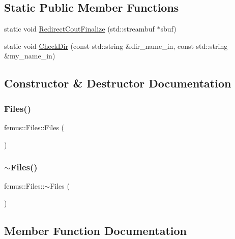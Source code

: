 \subsection*{Static Public Member Functions}
\begin{DoxyCompactItemize}
\item 
static void \mbox{\hyperlink{classfemus_1_1_files_ae26af478b9b9c891c929c6c26fcb3295}{Redirect\+Cout\+Finalize}} (std\+::streambuf $\ast$sbuf)
\item 
static void \mbox{\hyperlink{classfemus_1_1_files_a24664c23334c8b2aefde689a2102f523}{Check\+Dir}} (const std\+::string \&dir\+\_\+name\+\_\+in, const std\+::string \&my\+\_\+name\+\_\+in)
\end{DoxyCompactItemize}


\subsection{Constructor \& Destructor Documentation}
\mbox{\label{classfemus_1_1_files_ad41837f92d50a4970d4c33fe9888ab74}} 
\subsubsection{\texorpdfstring{Files()}{Files()}}
{\footnotesize\ttfamily femus\+::\+Files\+::\+Files (\begin{DoxyParamCaption}{ }\end{DoxyParamCaption})}

\mbox{\label{classfemus_1_1_files_a505d29577f727f29fe9fa34c9396a1b6}} 
\subsubsection{\texorpdfstring{$\sim$\+Files()}{~Files()}}
{\footnotesize\ttfamily femus\+::\+Files\+::$\sim$\+Files (\begin{DoxyParamCaption}{ }\end{DoxyParamCaption})}



\subsection{Member Function Documentation}
\mbox{\label{classfemus_1_1_files_a24664c23334c8b2aefde689a2102f523}} 
